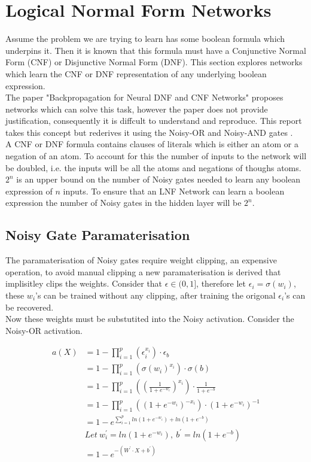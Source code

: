 \chapter{Logical Normal Form Networks}\label{C:workdone}
Assume the problem we are trying to learn has some boolean formula which underpins it. Then it is known that this formula must have a Conjunctive Normal Form (CNF) or Disjunctive Normal Form (DNF). This section explores networks which learn the CNF or DNF representation of any underlying boolean expression.\\

The paper "Backpropagation for Neural DNF and CNF Networks" \cite{herrmann1996backpropagation} proposes networks which can solve this task, however the paper does not provide justification, consequently it is diffcult to understand and reproduce. This report takes this concept but rederives it using the Noisy-OR and Noisy-AND gates \cite{LearningLogicalActivations}.\\

A CNF or DNF formula contains clauses of literals which is either an atom or a negation of an atom. To account for this the number of inputs to the network will be doubled, i.e. the inputs will be all the atoms and negations of thoughs atoms. $2^n$ is an upper bound on the number of Noisy gates needed to learn any boolean expression of $n$ inputs. To ensure that an LNF Network can learn a boolean expression the number of Noisy gates in the hidden layer will be $2^n$.

\section{Noisy Gate Paramaterisation} 
The paramaterisation of Noisy gates require weight clipping, an expensive operation, to avoid manual clipping a new paramaterisation is derived that implisitley clips the weights. Consider that $\epsilon \in (0, 1]$, therefore let $\epsilon_i = \sigma(w_i)$, these $w_i$'s can be trained without any clipping, after training the origonal $\epsilon_i$'s can be recovered.\\

Now these weights must be substutited into the Noisy activation. Consider the Noisy-OR activation.

\begin{align*}
a(X) &= 1 - \prod^p_{i=1}(\epsilon_i^{x_i}) \cdot \epsilon_b\\
&= 1 - \prod^p_{i=1}(\sigma(w_i)^{x_i}) \cdot \sigma(b)\\
&= 1 - \prod^p_{i=1}((\frac{1}{1 + e^{-w_i}})^{x_i}) \cdot \frac{1}{1 + e^{-b}}\\
&= 1 - \prod^p_{i=1}((1 + e^{-w_i})^{-x_i}) \cdot (1 + e^{-w_i})^{-1}\\
&= 1 - e^{\sum^p_{i=1} ln(1 + e^{-w_i}) + ln(1 + e^{-b})} \\
&Let\ w_i^{'} = ln(1 + e^{-w_i}),\ b^{'} = ln(1 + e^{-b})\\
&= 1 - e^{-(W^{'} \cdot X + b^{'})}
\end{align*}

